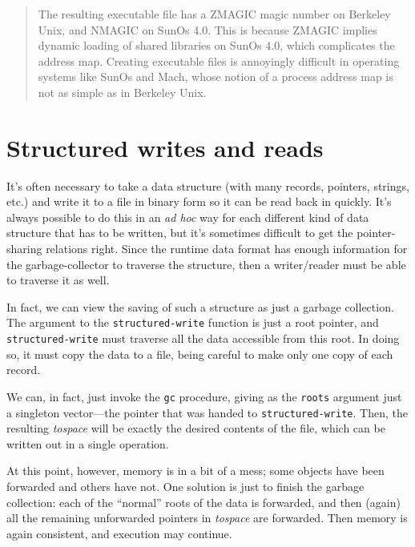 \begin{quotation}
{\small 
{}
The resulting executable file has a ZMAGIC magic number on
Berkeley Unix, and NMAGIC on SunOs 4.0.  This is because ZMAGIC
implies dynamic loading of shared libraries on SunOs 4.0, which complicates
the address map.  Creating executable files is annoyingly difficult
in operating systems like SunOs and Mach, whose notion of a process
address map is not as simple as in Berkeley Unix.
}
\end{quotation}
\section{Structured writes and reads}
\label{structured}

It's often necessary to take a data structure (with many records, pointers,
strings, etc.) and write it to a file in binary form so it can be read
back in quickly.  It's always possible to do this in an {\em ad hoc} way
for each different kind of data structure that has to be written, but
it's sometimes difficult to get the pointer-sharing relations right.
Since the runtime data format has enough information for the garbage-collector
to traverse the structure, then a writer/reader must be able to traverse
it as well.

In fact, we can view the saving of such a structure
as just a garbage collection.
The argument to the \verb"structured-write" function is just a root pointer,
and \verb"structured-write" must traverse all the data accessible from this
root.  In doing so, it must copy the data to a file, being careful
to make only one copy of each record.

We can, in fact, just invoke the \verb"gc" procedure, giving as the
\verb"roots" argument just a singleton vector---the pointer that
was handed to \verb"structured-write".  Then, the resulting {\em tospace}
will be exactly the desired contents of the file, which can be written
out in a single operation.

At this point, however, memory is in a bit of a mess; some objects have
been forwarded and others have not.  One solution is just to finish the
garbage collection: each of the ``normal'' roots of the data is
forwarded, and then (again) all the remaining unforwarded pointers in
{\em tospace} are forwarded.  Then memory is again consistent, and execution
may continue.

